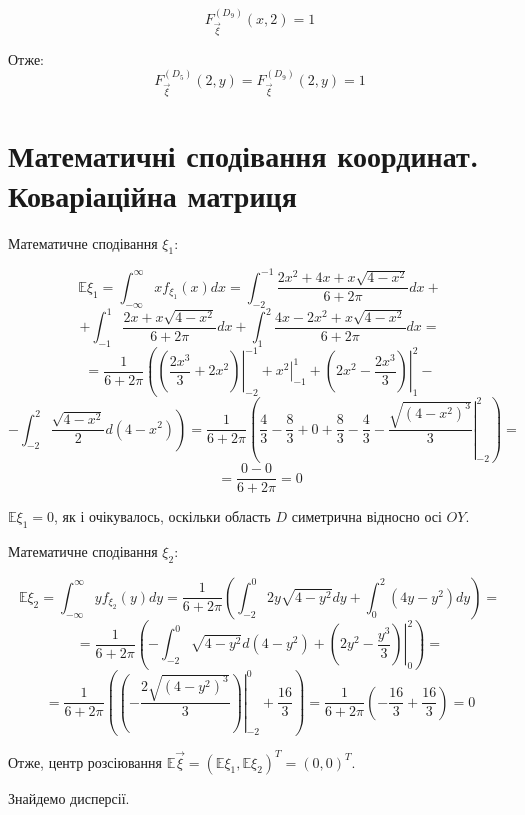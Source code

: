 \documentclass[14pt, a4paper, ukrainian]{extreport}
\begin{document}
	$$ F_{\vec\xi}^{\left({D_9}\right)}(x, 2) =  1
	$$
	
	Отже:	
	$$  F_{\vec\xi}^{\left({D_5}\right)}(2, y) =  F_{\vec\xi}^{\left({D_9}\right)}(2, y) = 1
	$$
	
		
	\section{Математичні сподівання координат. Коваріаційна матриця}
	
	Математичне сподівання $\xi_1$:
	
	$$\mathbb{E}\xi_1 = \int_{-\infty}^{\infty}xf_{\xi_1}(x)dx = \int_{-2}^{-1}\frac{2x^2 + 4x + x\sqrt{4-x^2}}{6+2\pi}dx +
	$$
	$$ + \int_{-1}^{1}\frac{2x + x\sqrt{4-x^2}}{6+2\pi}dx + \int_{1}^{2}\frac{4x-2x^2 + x\sqrt{4-x^2}}{6+2\pi}dx =
	$$
	$$ = \frac{1}{6+2\pi}\left(\left.\left(\frac{2x^3}{3} + 2x^2 \right)\right|_{-2}^{-1} + \left.{x^2}\right|_{-1}^{1} + \left.\left(2x^2 - \frac{2x^3}{3}\right)\right|_{1}^{2} - \right.$$
	$$ - \left.\int_{-2}^{2}\frac{\sqrt{4-x^2}}{2}d(4-x^2)\right) = 
	\frac{1}{6+2\pi} \left(\frac{4}{3} - \frac{8}{3} + 0 + \frac{8}{3} - \frac{4}{3} - \left. \frac{\sqrt{(4-x^2)^3}}{3}\right|_{-2}^2\right) =
	$$
	$$ = \frac{0 - 0}{6 + 2\pi} = 0
	$$
	
	$\mathbb{E}\xi_1 = 0$, як і очікувалось, оскільки область $D$ симетрична відносно осі $OY$.
	
	
	Математичне сподівання $\xi_2$:
	
	$$\mathbb{E}\xi_2 = \int_{-\infty}^{\infty}yf_{\xi_2}(y)dy =\frac{1}{6+2\pi}\left(\int_{-2}^{0}2y\sqrt{4-y^2}dy + \int_{0}^{2}(4y-y^2)dy\right) = 
	$$
	$$ = \frac{1}{6+2\pi}\left(-\int_{-2}^{0}\sqrt{4-y^2}d(4-y^2) + \left.\left(2y^2 - \frac{y^3}{3}\right)\right|_0^2\right) = 
	$$
	$$ = \frac{1}{6+2\pi}\left(\left.\left(-\frac{2\sqrt{(4-y^2)^3}}{3}\right)\right|_{-2}^0 + \frac{16}{3}\right) =
	 \frac{1}{6+2\pi}\left(-\frac{16}{3} + \frac{16}{3}\right) = 0
	$$
	
	Отже, центр розсіювання $\mathbb{E}\vec\xi = (\mathbb{E}\xi_1, \mathbb{E}\xi_2)^T = (0, 0)^T$.
	
	Знайдемо дисперсії.
	
\end{document}
